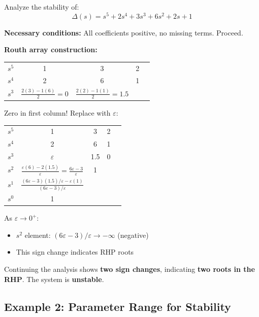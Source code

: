 \begin{example}
\label{ex:routh_special1}
Analyze the stability of:
\begin{equation}
\Delta(s) = s^5 + 2s^4 + 3s^3 + 6s^2 + 2s + 1
\end{equation}

\textbf{Necessary conditions:} All coefficients positive, no missing terms. Proceed.

\textbf{Routh array construction:}

\begin{center}
\begin{tabular}{c|cccc}
$s^5$ & 1 & 3 & 2 \\
$s^4$ & 2 & 6 & 1 \\
$s^3$ & $\frac{2(3)-1(6)}{2} = 0$ & $\frac{2(2)-1(1)}{2} = 1.5$ & \\
\end{tabular}
\end{center}

Zero in first column! Replace with $\varepsilon$:

\begin{center}
\begin{tabular}{c|cccc}
$s^5$ & 1 & 3 & 2 \\
$s^4$ & 2 & 6 & 1 \\
$s^3$ & $\varepsilon$ & 1.5 & 0 \\
$s^2$ & $\frac{\varepsilon(6) - 2(1.5)}{\varepsilon} = \frac{6\varepsilon - 3}{\varepsilon}$ & 1 & \\
$s^1$ & $\frac{(6\varepsilon-3)(1.5)/\varepsilon - \varepsilon(1)}{(6\varepsilon-3)/\varepsilon}$ & & \\
$s^0$ & 1 & &
\end{tabular}
\end{center}

As $\varepsilon \to 0^+$:
\begin{itemize}
    \item $s^2$ element: $(6\varepsilon - 3)/\varepsilon \to -\infty$ (negative)
    \item This sign change indicates RHP roots
\end{itemize}

Continuing the analysis shows \textbf{two sign changes}, indicating \textbf{two roots in the RHP}. The system is \textbf{unstable}.
\end{example}

\subsection{Example 2: Parameter Range for Stability}

